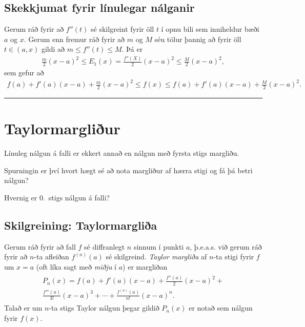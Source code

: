 \documentclass[b5paper,11pt,icelandic]{sphinxmanual}
\begin{document}
\subsection{Skekkjumat fyrir línulegar nálganir}
\label{kafli03:skekkjumat-fyrir-linulegar-nalganir}
Gerum ráð fyrir að \(f''(t)\) sé skilgreint fyrir öll \(t\) í
opnu bili sem inniheldur bæði \(a\) og \(x\). Gerum enn fremur
ráð fyrir að \(m\) og \(M\) séu tölur þannig að fyrir öll
\(t\in (a, x)\) gildi að \(m\leq f''(t)\leq M\). Þá er
\begin{equation*}
\begin{split}\frac{m}{2}(x-a)^2\leq E_1(x)
=\frac{f''(X)}{2}(x-a)^2\leq \frac{M}{2}(x-a)^2,\end{split}
\end{equation*}
sem gefur að
\begin{equation*}
\begin{split}f(a)+f'(a)(x-a)+\frac{m}{2}(x-a)^2\leq f(x)
\leq f(a)+f'(a)(x-a)+\frac{M}{2}(x-a)^2.\end{split}
\end{equation*}

\bigskip\hrule{}\bigskip



\section{Taylormargliður}
\label{kafli03:taylormargliur}
Línuleg nálgun á falli er ekkert annað en nálgun með fyrsta stigs
margliðu.

Spurningin er því hvort hægt sé að nota margliður af hærra stigi og fá
þá betri nálgun?

Hvernig er 0. stigs nálgun á falli?


\subsection{Skilgreining: Taylormargliða}
\label{kafli03:index-13}\label{kafli03:skilgreining-taylormarglia}
Gerum ráð fyrir að fall \(f\) sé diffranlegt \(n\) sinnum í
punkti \(a\), þ.e.a.s. við gerum ráð fyrir að \(n\)-ta afleiðan
\(f^{(n)}(a)\) sé skilgreind. \emph{Taylor margliða} af \(n\)-ta
stigi fyrir \(f\) um \(x=a\) (oft líka sagt með \emph{miðju} í
\(a\)) er margliðan
\begin{equation*}
\begin{split}\begin{gathered}
    P_n(x)=f(a)+f'(a)(x-a)+\frac{f''(a)}{2}(x-a)^2+ \\
    \frac{f'''(a)}{3!}(x-a)^3+\cdots+\frac{f^{(n)}(a)}{n!}(x-a)^n.\end{gathered}\end{split}
\end{equation*}
Talað er um \(n\)-ta stigs Taylor nálgun þegar gildið \(P_n(x)\)
er notað sem nálgun fyrir \(f(x)\).
\end{document}
